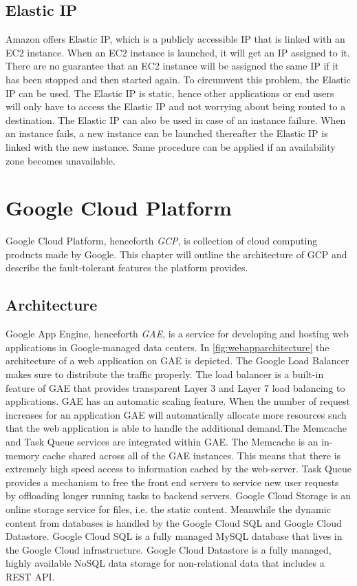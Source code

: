 \documentclass[11pt]{report}
\begin{document}
\section{Elastic IP}
Amazon offers Elastic IP, which is a publicly accessible IP that is linked with an EC2 instance. When an EC2 instance is launched, it will get an IP assigned to it. There are no guarantee that an EC2 instance will be assigned the same IP if it has been stopped and then started again. To circumvent this problem, the Elastic IP can be used. The Elastic IP is static, hence other applications or end users will only have to access the Elastic IP and not worrying about being routed to a destination. The Elastic IP can also be used in case of an instance failure. When an instance fails, a new instance can be launched thereafter the Elastic IP is linked with the new instance. Same procedure can be applied if an availability zone becomes unavailable.


\chapter{Google Cloud Platform}
Google Cloud Platform, henceforth \emph{GCP}, is collection of cloud computing products made by Google. This chapter will outline the architecture of GCP and describe the fault-tolerant features the platform provides.

\section{Architecture}
Google App Engine, henceforth \emph{GAE}, is a service for developing and hosting web applications in Google-managed data centers. In \autoref{fig:webapparchitecture} the architecture of a web application on GAE is depicted. The Google Load Balancer makes sure to distribute the traffic properly. The load balancer is a built-in feature of GAE that provides transparent Layer 3 and Layer 7 load balancing to applications. GAE has an automatic scaling feature. When the number of request increases for an application GAE will automatically allocate more resources such that the web application is able to handle the additional demand.The Memcache and Task Queue services are integrated within GAE. The Memcache is an in-memory cache shared across all of the GAE instances. This means that there is extremely high speed access to information cached by the web-server. Task Queue provides a mechanism to free the front end servers to service new user requests by offloading longer running tasks to backend servers. Google Cloud Storage is an online storage service for files, i.e. the static content. Meanwhile the dynamic content from databases is handled by the Google Cloud SQL and Google Cloud Datastore. Google Cloud SQL is a fully managed MySQL database that lives in the Google Cloud infrastructure. Google Cloud Datastore is a fully managed, highly available NoSQL data storage for non-relational data that includes a REST API.
\end{document}
